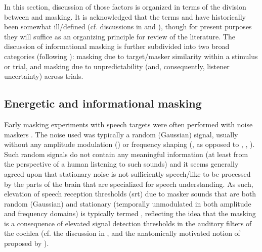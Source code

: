 In this section, discussion of those factors is organized in terms of the division between  and  masking.  It is acknowledged that the terms  and  have historically been somewhat ill\-/defined (cf. discussions in \citealt{DurlachEtAl2003a} and \citealt{Watson2005}), though for present purposes they will suffice as an organizing principle for review of the literature.  The discussion of informational masking is further subdivided into two broad categories (following \citealt{KiddEtAl2002} \etseq): masking due to target\-/masker similarity within a stimulus or trial, and masking due to unpredictability (and, consequently, listener uncertainty) across trials.  

\subsection{Energetic and informational masking\label{sec:InfoMasking}}
Early masking experiments with speech targets were often performed with noise maskers \citep[\eg,][]{HawkinsStevens1950,Tolhurst1957b,PollackPickett1958}.  The noise used was typically a random (Gaussian) signal, usually without any amplitude modulation () or frequency shaping (, as opposed to , , \etc).  Such random signals do not contain any meaningful information (at least from the perspective of a human listening to such sounds) and it seems generally agreed upon that stationary noise is not sufficiently speech\-/like to be processed by the parts of the brain that are specialized for speech understanding.  As such, elevation of speech reception thresholds (\ac{srt}) due to masker sounds that are both random (Gaussian) and stationary (temporally unmodulated in both amplitude and frequency domains) is typically termed , reflecting the idea that the masking is a consequence of elevated signal detection thresholds in the auditory filters of the cochlea (cf. the discussion in \citealt[96–97]{Moore2008}, and the anatomically motivated notion of  proposed by \citealt{DurlachEtAl2003a}).  

